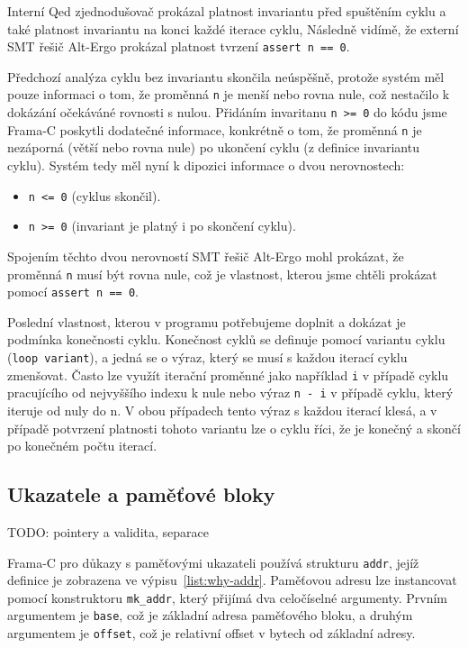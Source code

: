 Interní Qed zjednodušovač prokázal platnost invariantu před spuštěním cyklu a také platnost invariantu na konci každé iterace cyklu,
Následně vidímě, že externí SMT řešič Alt-Ergo prokázal platnost tvrzení \texttt{assert n == 0}.

Předchozí analýza cyklu bez invariantu skončila neúspěšně,
protože systém měl pouze informaci o tom, že proměnná \texttt{n} je menší nebo rovna nule,
což nestačilo k dokázání očekáváné rovnosti s nulou.
Přidáním invaritanu \texttt{n >= 0} do kódu jsme Frama\mbox{-}C poskytli dodatečné informace,
konkrétně o tom, že proměnná \texttt{n} je nezáporná (větší nebo rovna nule) po ukončení cyklu (z definice invariantu cyklu).
Systém tedy měl nyní k dipozici informace o dvou nerovnostech:

\begin{itemize}
    \item \texttt{n <= 0} (cyklus skončil).
    \item \texttt{n >= 0} (invariant je platný i po skončení cyklu).
\end{itemize}

Spojením těchto dvou nerovností SMT řešič Alt-Ergo mohl prokázat,
že proměnná \texttt{n} musí být rovna nule,
což je vlastnost, kterou jsme chtěli prokázat pomocí \texttt{assert n == 0}.

Poslední vlastnost, kterou v programu potřebujeme doplnit a dokázat je podmínka konečnosti cyklu.
Konečnost cyklů se definuje pomocí variantu cyklu (\texttt{loop variant}),
a jedná se o výraz,
který se musí s každou iterací cyklu zmenšovat.
Často lze využít iterační proměnné jako například \texttt{i} v případě cyklu pracujícího od nejvyššího indexu k nule
nebo výraz \texttt{n - i} v případě cyklu, který iteruje od nuly do n.
V obou případech tento výraz s každou iterací klesá,
a v případě potvrzení platnosti tohoto variantu lze o cyklu říci,
že je konečný a skončí po konečném počtu iterací.




\subsection{Ukazatele a paměťové bloky}
\label{subsec:acsl-anotace-ukazatele-a-pametove-bloky}

TODO: pointery a validita, separace

Frama\mbox{-}C pro důkazy s paměťovými ukazateli používá strukturu \texttt{addr},
jejíž definice je zobrazena ve výpisu~\ref{list:why-addr}.
Paměťovou adresu lze instancovat pomocí konstruktoru \texttt{mk\_addr},
který přijímá dva celočíselné argumenty.
Prvním argumentem je \texttt{base}, což je základní adresa paměťového bloku,
a druhým argumentem je \texttt{offset}, což je relativní offset v bytech od základní adresy.

